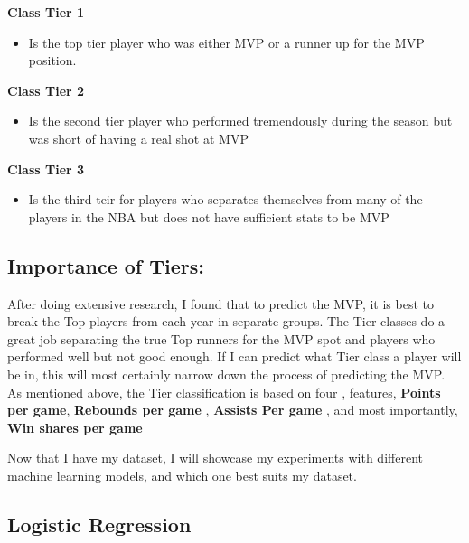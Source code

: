 \documentclass[11pt]{article}
\providecommand{\tightlist}{%
      \setlength{\itemsep}{0pt}\setlength{\parskip}{0pt}}
\begin{document}
\textbf{Class Tier 1}

\begin{itemize}
\tightlist
\item
  Is the top tier player who was either MVP or a runner up for the MVP
  position.
\end{itemize}

\textbf{Class Tier 2}

\begin{itemize}
\tightlist
\item
  Is the second tier player who performed tremendously during the season
  but was short of having a real shot at MVP
\end{itemize}

\textbf{Class Tier 3}

\begin{itemize}
\tightlist
\item
  Is the third teir for players who separates themselves from many of
  the players in the NBA but does not have sufficient stats to be MVP
\end{itemize}

\subsection{Importance of Tiers:}\label{importance-of-tiers}

After doing extensive research, I found that to predict the MVP, it is
best to break the Top players from each year in separate groups. The
Tier classes do a great job separating the true Top runners for the MVP
spot and players who performed well but not good enough. If I can
predict what Tier class a player will be in, this will most certainly
narrow down the process of predicting the MVP. As mentioned above, the
Tier classification is based on four , features, \textbf{Points per
game}, \textbf{Rebounds per game} , \textbf{Assists Per game} , and most
importantly, \textbf{Win shares per game}

Now that I have my dataset, I will showcase my experiments with
different machine learning models, and which one best suits my dataset.

    \subsection{Logistic Regression}\label{logistic-regression}
\end{document}
